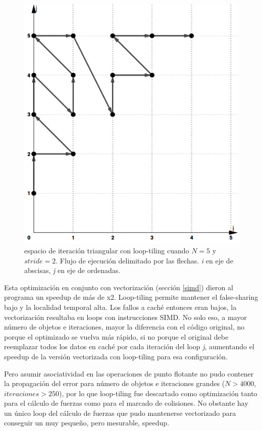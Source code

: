 \documentclass{article}
\begin{document}
\begin{figure}[h!]
	\centering
	\includegraphics[width=0.6\linewidth,height=0.6\textwidth]{resources/loop_anidado_tiling_505x565.png}
	\caption{espacio de iteración triangular con loop-tiling cuando $N=5$ y $stride=2$. Flujo de ejecución
	delimitado por las flechas. \textit{i} en eje de abscisas, \textit{j} en eje de ordenadas.}
	\label{fig:no_tiling}
\end{figure}


Esta optimización en conjunto con vectorización (sección \ref{simd}) dieron al programa un speedup de más de x2.
Loop-tiling permite mantener el false-sharing bajo y la localidad temporal alta. Los fallos a caché entonces eran bajos,
la vectorización resultaba en loops con instrucciones SIMD. No solo eso, a mayor número de objetos e iteraciones, mayor la diferencia con
el código original, no porque el optimizado se vuelva más rápido, si no porque el original debe reemplazar todos los datos en caché por cada
iteración del loop \textit{j}, aumentando el speedup de la versión vectorizada con loop-tiling para esa configuración.


Pero asumir asociatividad en las operaciones de punto flotante no pudo contener la propagación del error
para número de objetos e iteraciones grandes ($N > 4000$, $iteraciones > 250$), por lo que loop-tiling fue descartado
como optimización tanto para el cálculo de fuerzas como para el marcado de colisiones. No obstante hay un único loop del cálculo de fuerzas que pudo mantenerse vectorizado para conseguir un muy pequeño, pero
mesurable, speedup.
\end{document}
